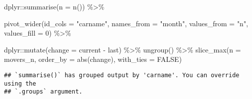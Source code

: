 \documentclass[
]{article}
\newenvironment{Shaded}{\begin{snugshade}}{\end{snugshade}}
\newcommand{\AttributeTok}[1]{\textcolor[rgb]{0.77,0.63,0.00}{#1}}
\newcommand{\ConstantTok}[1]{\textcolor[rgb]{0.00,0.00,0.00}{#1}}
\newcommand{\DecValTok}[1]{\textcolor[rgb]{0.00,0.00,0.81}{#1}}
\newcommand{\FunctionTok}[1]{\textcolor[rgb]{0.00,0.00,0.00}{#1}}
\newcommand{\NormalTok}[1]{#1}
\newcommand{\SpecialCharTok}[1]{\textcolor[rgb]{0.00,0.00,0.00}{#1}}
\newcommand{\StringTok}[1]{\textcolor[rgb]{0.31,0.60,0.02}{#1}}
\begin{document}
\begin{Shaded}
\begin{Highlighting}[]
\NormalTok{  dplyr}\SpecialCharTok{::}\FunctionTok{summarise}\NormalTok{(}\AttributeTok{n =} \FunctionTok{n}\NormalTok{()) }\SpecialCharTok{\%\textgreater{}\%}
  
  \FunctionTok{pivot\_wider}\NormalTok{(}\AttributeTok{id\_cols =} \StringTok{"carname"}\NormalTok{, }\AttributeTok{names\_from =} \StringTok{"month"}\NormalTok{, }\AttributeTok{values\_from =} \StringTok{"n"}\NormalTok{, }\AttributeTok{values\_fill =} \DecValTok{0}\NormalTok{) }\SpecialCharTok{\%\textgreater{}\%}
  
\NormalTok{  dplyr}\SpecialCharTok{::}\FunctionTok{mutate}\NormalTok{(}\AttributeTok{change =}\NormalTok{ current }\SpecialCharTok{{-}}\NormalTok{ last) }\SpecialCharTok{\%\textgreater{}\%}
  \FunctionTok{ungroup}\NormalTok{() }\SpecialCharTok{\%\textgreater{}\%}
  \FunctionTok{slice\_max}\NormalTok{(}\AttributeTok{n =}\NormalTok{ movers\_n, }\AttributeTok{order\_by =} \FunctionTok{abs}\NormalTok{(change), }\AttributeTok{with\_ties =} \ConstantTok{FALSE}\NormalTok{)}
\end{Highlighting}
\end{Shaded}

\begin{verbatim}
## `summarise()` has grouped output by 'carname'. You can override using the
## `.groups` argument.
\end{verbatim}
\end{document}

